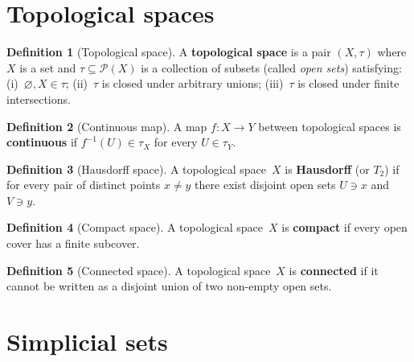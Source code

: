 \documentclass[a4paper,12pt]{book}
\theoremstyle{definition}
\newtheorem{definition}{Definition}[section]
\theoremstyle{plain}
\theoremstyle{remark}
\begin{document}
\section{Topological spaces}\label{sec:app-topology}

\begin{definition}[Topological space]\label{def:app-top-space}
A \textbf{topological space} is a pair $(X, \tau)$ where $X$ is a set
and $\tau\subseteq\mathcal{P}(X)$ is a collection of subsets (called
\emph{open sets}) satisfying: (i)~$\varnothing, X\in\tau$;
(ii)~$\tau$ is closed under arbitrary unions; (iii)~$\tau$ is closed
under finite intersections.
\end{definition}

\begin{definition}[Continuous map]\label{def:app-continuous}
A map $f\colon X\to Y$ between topological spaces is \textbf{continuous}
if $f^{-1}(U)\in\tau_X$ for every $U\in\tau_Y$.
\end{definition}

\begin{definition}[Hausdorff space]\label{def:app-hausdorff}
A topological space~$X$ is \textbf{Hausdorff} (or $T_2$) if for every
pair of distinct points $x\ne y$ there exist disjoint open sets
$U\ni x$ and $V\ni y$.
\end{definition}

\begin{definition}[Compact space]\label{def:app-compact}
A topological space~$X$ is \textbf{compact} if every open cover has a
finite subcover.
\end{definition}

\begin{definition}[Connected space]\label{def:app-connected}
A topological space~$X$ is \textbf{connected} if it cannot be written
as a disjoint union of two non-empty open sets.
\end{definition}


\section{Simplicial sets}\label{sec:app-simplicial}
\end{document}
